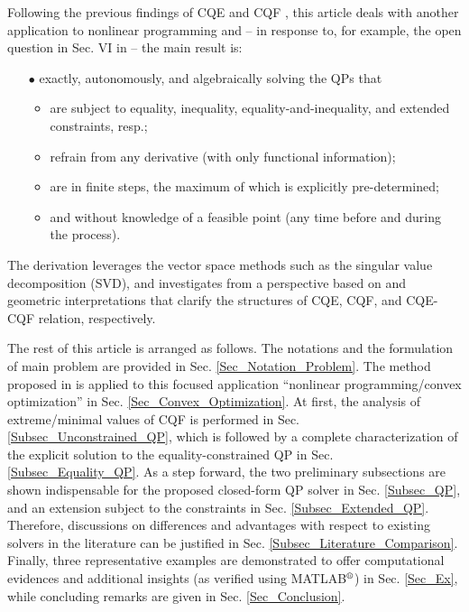 \documentclass{imaman}
\numberwithin{equation}{section}
\begin{document}
Following the previous findings of CQE and CQF \cite{LiLiHs:20}, this article deals with another application to nonlinear programming and -- in response to, for example, the open question in Sec. VI in \cite{DuJoWaWi:15} -- the main result is:
\begin{enumerate}
\item[$\bullet$] exactly, autonomously, and algebraically solving the QPs that 
    \begin{itemize}
    \item are subject to equality, inequality, equality-and-inequality, and extended constraints, resp.;
    \item refrain from any derivative (with only functional information);
    \item are in finite steps, the maximum of which is explicitly pre-determined;
    \item and without knowledge of a feasible point (any time before and during the process).
    \end{itemize}
\end{enumerate}
The derivation leverages the vector space methods such as the singular value decomposition (SVD), and investigates from a perspective based on \cite{LiLiHs:20} and geometric interpretations that clarify the structures of CQE, CQF, and CQE-CQF relation, respectively.

The rest of this article is arranged as follows. The notations and the formulation of main problem are provided in Sec. \ref{Sec_Notation_Problem}. The method proposed in  \cite{LiLiHs:20} is applied to this focused application ``nonlinear programming/convex optimization'' in Sec. \ref{Sec_Convex_Optimization}. At first, the analysis of extreme/minimal values of CQF is performed in Sec. \ref{Subsec_Unconstrained_QP}, which is followed by a complete characterization of the explicit solution to the equality-constrained QP in Sec. \ref{Subsec_Equality_QP}. As a step forward, the two preliminary subsections are shown indispensable for the proposed closed-form QP solver in Sec. \ref{Subsec_QP}, and an extension subject to the constraints in Sec. \ref{Subsec_Extended_QP}. Therefore, discussions on differences and advantages with respect to existing solvers in the literature can be justified in Sec. \ref{Subsec_Literature_Comparison}. Finally, three representative examples are demonstrated to offer computational evidences and additional insights (as verified using MATLAB$\textsuperscript{\textregistered}$) in Sec. \ref{Sec_Ex}, while concluding remarks are given in Sec. \ref{Sec_Conclusion}.
\end{document}
